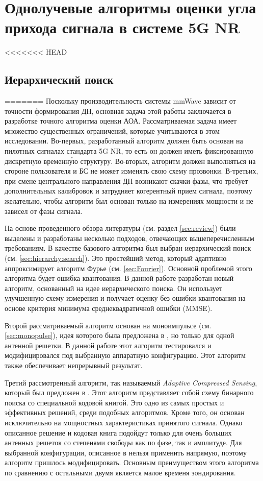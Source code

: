 \section{Однолучевые алгоритмы оценки угла прихода сигнала в системе 5G NR}
\label{sec:singlepath}
<<<<<<< HEAD
\subsection{Иерархический поиск}
=======
Поскольку производительность системы mmWave зависит от точности формирования ДН,
основная задача этой работы заключается в разработке точного алгоритма оценки
АОА. Рассматриваемая задача имеет множество существенных ограничений, которые
учитываются в этом исследовании.  Во-первых, разработанный алгоритм должен быть
основан на пилотных сигналах стандарта 5G NR, то есть он должен иметь
фиксированную дискретную временн\'{у}ю структуру.  Во-вторых,
алгоритм должен выполняться на стороне пользователя и БС не может изменять свою
схему прозвонки. В-третьих, при смене центрального направления ДН возникают
скачки фазы, что требует дополнительных калибровок и затрудняет когерентный
прием сигнала, поэтому желательно, чтобы алгоритм был основан только на
измерениях мощности и не зависел от фазы сигнала.

На основе проведенного обзора литературы (см. раздел \ref{sec:review})
были выделены и разработаны несколько подходов, отвечающих вышеперечисленным
требованиям. В качестве базового алгоритма был выбран
иерархический поиск (см.  \ref{sec:hierarchy:search}).  Это простейший метод,
который адаптивно аппроксимирует алгоритм Фурье (см. \ref{sec:Fourier}).
Основной проблемой этого алгоритма будет ошибка квантования.  В данной работе
разработан новый алгоритм, основанный на идее иерархического поиска.  Он
использует улучшенную схему измерения и получает оценку без ошибки квантования
на основе критерия минимума среднеквадратичной ошибки (MMSE).

Второй рассматриваемый алгоритм основан на моноимпульсе (см.
\ref{sec:monopulse}), идея которого была предложена в \cite{Zhu2016, Kim2019},
но только для одной антенной решетки. В данной работе этот алгоритм тестировался
и модифицировался под выбранную аппаратную конфигурацию.  Этот алгоритм также
обеспечивает непрерывный результат.

Третий рассмотренный алгоритм, так называемый \textit{Adaptive Compressed
    Sensing}, который был предложен в \cite{Alkhateeb2014}.  Этот алгоритм
представляет собой схему бинарного поиска со специальной кодовой книгой. Это
одно из самых простых и эффективных решений, среди подобных алгоритмов.  Кроме
того, он основан исключительно на мощностных характеристиках принятого сигнала.
Однако описанное решение и кодовая книга подойдут только для очень больших
антенных решеток со степенями свободы как по фазе, так и амплитуде. Для
выбранной конфигурации, описанное в \cite{Alkhateeb2014} нельзя применить
напрямую, поэтому алгоритм пришлось модифицировать.  Основным преимуществом
этого алгоритма по сравнению с остальными двумя является малое временя зондирования.

